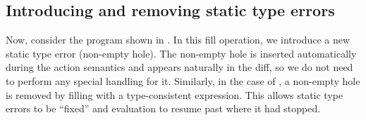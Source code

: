 \subsection{Introducing and removing static type errors}
\label{sec:far-static-error-examples}

Now, consider the program shown in . In this fill operation, we introduce a new static type error (non-empty hole). The non-empty hole is inserted automatically during the action semantics and appears naturally in the diff, so we do not need to perform any special handling for it. Similarly, in the case of , a non-empty hole is removed by filling with a type-consistent expression. This allows static type errors to be ``fixed'' and evaluation to resume past where it had stopped.

